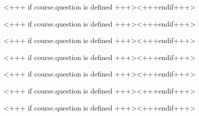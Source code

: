 \documentclass[english,xcolor=pdftex,dvipsnames,aspectratio=<+++ if course.aspectratio is defined +++><++course.aspectratio++><+++else+++>43<+++endif+++>]{beamer}
\begin{document}

<+++ if course.question is defined +++><+++endif+++>


<+++ if course.question is defined +++><+++endif+++> 


<+++ if course.question is defined +++><+++endif+++>


<+++ if course.question is defined +++><+++endif+++>
      

%

%

%


<+++ if course.question is defined +++><+++endif+++>


<+++ if course.question is defined +++><+++endif+++>


<+++ if course.question is defined +++><+++endif+++>



%
\end{document}
